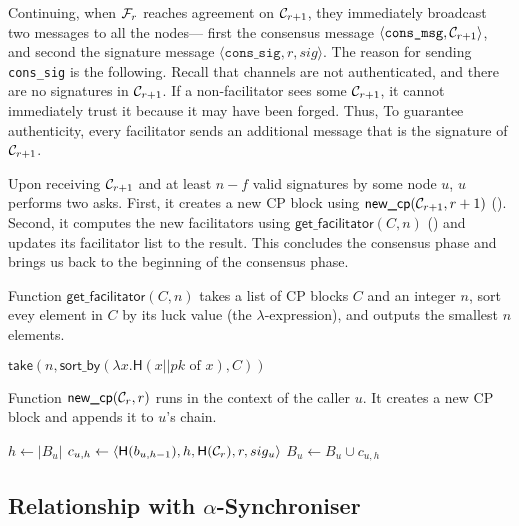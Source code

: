 Continuing, when $\mathcal{F}_{r}$ reaches agreement on $\mathcal{C}_{r+1}$,
they immediately broadcast two messages to all the nodes---
first the consensus message $\langle \texttt{cons\_msg}, \mathcal{C}_{r+1} \rangle$,
and second the signature message $\langle \texttt{cons\_sig}, r, sig \rangle$.
The reason for sending \texttt{cons\_sig} is the following.
Recall that channels are not authenticated, 
and there are no signatures in $\mathcal{C}_{r + 1}$.
If a non-facilitator sees some $\mathcal{C}_{r + 1}$, it cannot immediately trust it because it may have been forged.
Thus, To guarantee authenticity, every facilitator sends an additional message that is the signature of $\mathcal{C}_{r + 1}$.

Upon receiving $\mathcal{C}_{r + 1}$ and at least $n - f$ valid signatures by some node $u$, $u$ performs two asks.
First, it creates a new CP block using $\textsf{new\_cp}(\mathcal{C}_{r + 1}, r + 1)$ ().
Second, it computes the new facilitators using $\textsf{get\_facilitator}(C, n)$ ()
and updates its facilitator list to the result.
This concludes the consensus phase and brings us back to the beginning of the consensus phase.

\begin{algorithm}
\caption{Function $\textsf{get\_facilitator}(C, n)$ takes a list of CP blocks $C$ and an integer $n$,
sort evey element in $C$ by its luck value (the $\lambda$-expression), and outputs the smallest $n$ elements.}
\label{alg:facilitator}
\begin{algorithmic}
\State $\textsf{take} (n, \textsf{sort\_by} (\lambda x.\textsf{H}(x || pk \text{ of } x), C))$
\end{algorithmic}
\end{algorithm}

\begin{algorithm}
\caption{Function $\textsf{new\_cp}(\mathcal{C}_r, r)$ runs in the context of the caller $u$.
It creates a new CP block and appends it to $u$'s chain.}
\label{alg:new-cp}
\begin{algorithmic}
\State $h \gets |B_u|$
\State $c_{u, h} \gets \langle \textsf{H}(b_{u, h-1}), h, \textsf{H}(\mathcal{C}_r), r, sig_u \rangle$
\State $B_u \gets B_u \cup c_{u, h}$
\end{algorithmic}
\end{algorithm}

\subsection{Relationship with $\alpha$-Synchroniser}


